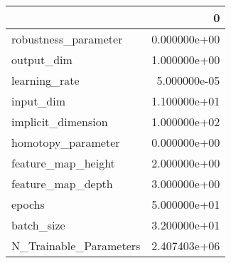\begin{tabular}{lr}
\toprule
{} &             0 \\
\midrule
robustness\_parameter   &  0.000000e+00 \\
output\_dim             &  1.000000e+00 \\
learning\_rate          &  5.000000e-05 \\
input\_dim              &  1.100000e+01 \\
implicit\_dimension     &  1.000000e+02 \\
homotopy\_parameter     &  0.000000e+00 \\
feature\_map\_height     &  2.000000e+00 \\
feature\_map\_depth      &  3.000000e+00 \\
epochs                 &  5.000000e+01 \\
batch\_size             &  3.200000e+01 \\
N\_Trainable\_Parameters &  2.407403e+06 \\
\bottomrule
\end{tabular}
